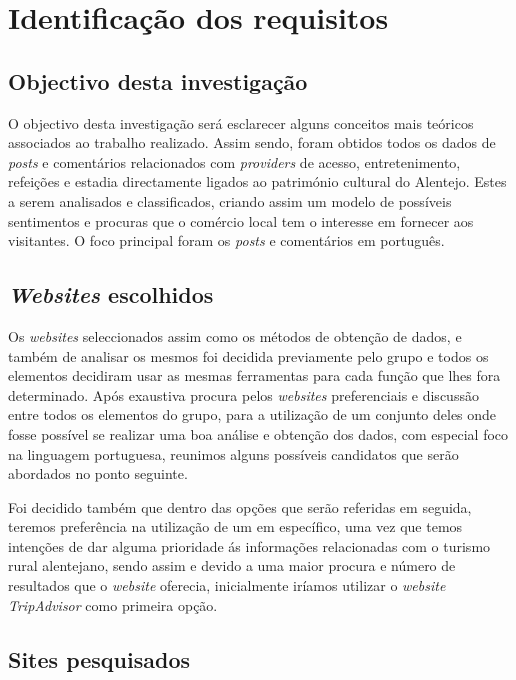 \chapter{Identificação dos requisitos}
\label{cap2}
\section{Objectivo desta investigação}

O objectivo desta investigação será esclarecer alguns conceitos mais teóricos associados ao trabalho realizado. 
Assim sendo, foram obtidos todos os dados de \textit{posts} e comentários relacionados com \textit{providers} de acesso, entretenimento, refeições e estadia directamente ligados ao património cultural do Alentejo. Estes a serem analisados e classificados, criando assim um modelo de possíveis sentimentos e procuras que o comércio local tem o interesse em fornecer aos visitantes. O foco principal foram os \textit{posts} e comentários em português.

\section{\textit{Websites} escolhidos}

Os \textit{websites} seleccionados assim como os métodos de obtenção de dados, e também de analisar os mesmos foi decidida previamente pelo grupo e todos os elementos decidiram usar as mesmas ferramentas para cada função que lhes fora determinado.
Após exaustiva procura pelos \textit{websites} preferenciais e discussão entre todos os elementos do grupo, para a utilização de um conjunto deles onde fosse possível se realizar uma boa análise e obtenção dos dados, com especial foco na linguagem portuguesa, reunimos alguns possíveis candidatos que serão abordados no ponto seguinte.

Foi decidido também que dentro das opções que serão referidas em seguida, teremos preferência na utilização de um em específico, uma vez que temos intenções de dar alguma prioridade ás informações relacionadas com o turismo rural alentejano, sendo assim e devido a uma maior procura e número de resultados que o \textit{website} oferecia, inicialmente iríamos utilizar o \textit{website TripAdvisor} como primeira opção.

\section{Sites pesquisados}

